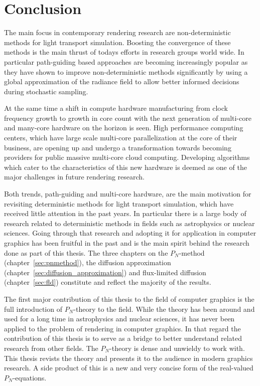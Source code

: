 \chapter{Conclusion}
%
\label{sec:conclusion}

The main focus in contemporary rendering research are non-deterministic methods for light transport simulation. Boosting the convergence of these methods is the main thrust of todays efforts in research groups world wide. In particular path-guiding based approaches are becoming increasingly popular as they have shown to improve non-deterministic methods significantly by using a global approximation of the radiance field to allow better informed decisions during stochastic sampling.

At the same time a shift in compute hardware manufacturing from clock frequency growth to growth in core count with the next generation of multi-core and many-core hardware on the horizon is seen. High performance computing centers, which have large scale multi-core parallelization at the core of their business, are opening up and undergo a transformation towards becoming providers for public massive multi-core cloud computing. Developing algorithms which cater to the characteristics of this new hardware is deemed as one of the major challenges in future rendering research.

Both trends, path-guiding and multi-core hardware, are the main motivation for revisiting deterministic methods for light transport simulation, which have received little attention in the past years. In particular there is a large body of research related to deterministic methods in fields such as astrophysics or nuclear sciences. Going through that research and adopting it for application in computer graphics has been fruitful in the past and is the main spirit behind the research done as part of this thesis. The three chapters on the $P_N$-method (chapter~\ref{sec:pnmethod}), the diffusion approximation (chapter~\ref{sec:diffusion_approximation}) and flux-limited diffusion (chapter~\ref{sec:fld}) constitute and reflect the majority of the results.

The first major contribution of this thesis to the field of computer graphics is the full introduction of $P_N$-theory to the field. While the theory has been around and used for a long time in astrophysics and nuclear sciences, it has never been applied to the problem of rendering in computer graphics. In that regard the contribution of this thesis is to serve as a bridge to better understand related research from other fields. The $P_N$-theory is dense and unwieldy to work with. This thesis revists the theory and presents it to the audience in modern graphics research. A side product of this is a new and very concise form of the real-valued $P_N$-equations.

